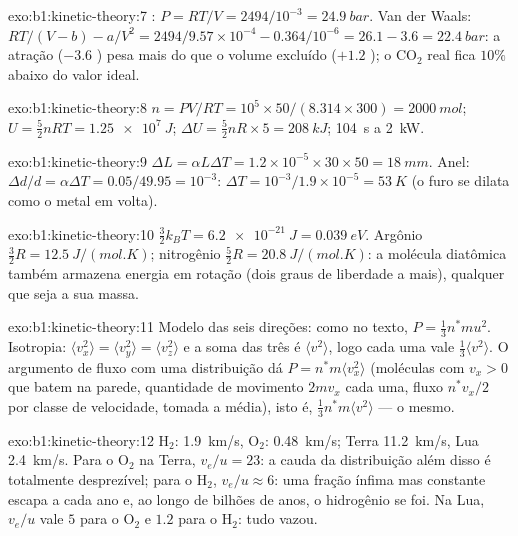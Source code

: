 \begin{solution}{exo:b1:kinetic-theory:7}
: $P = RT/V = 2494/10^{-3} = \qty{24.9}{bar}$. Van der Waals:
$RT/(V - b) - a/V^2 = 2494/9.57\times10^{-4} - 0.364/10^{-6} = 26.1 - 3.6 =
\qty{22.4}{bar}$: a atração ($-3.6$ ) pesa mais do que o volume
excluído ($+1.2$ ); o CO$_2$ real fica $10\%$ abaixo do valor ideal.
\end{solution}

\begin{solution}{exo:b1:kinetic-theory:8}
$n = PV/RT = 10^5 \times 50/(8.314 \times 300) = \qty{2000}{mol}$; $U = \tfrac52
nRT = \qty{1.25e7}{J}$; $\Delta U = \tfrac52 nR \times 5 = \qty{208}{kJ}$;
\qty{104}{s} a \qty{2}{kW}.
\end{solution}

\begin{solution}{exo:b1:kinetic-theory:9}
$\Delta L = \alpha L\Delta T = 1.2\times10^{-5} \times 30 \times 50 = \qty{18}{mm}$.
Anel: $\Delta d/d = \alpha\Delta T = 0.05/49.95 = 10^{-3}$: $\Delta T = 10^{-3}/
1.9\times10^{-5} = \qty{53}{K}$ (o furo se dilata como o metal em volta).
\end{solution}

\begin{solution}{exo:b1:kinetic-theory:10}
$\tfrac32 k_BT = \qty{6.2e-21}{J} = \qty{0.039}{eV}$. Argônio $\tfrac32 R =
\qty{12.5}{J/(mol.K)}$; nitrogênio $\tfrac52 R = \qty{20.8}{J/(mol.K)}$: a
molécula diatômica também armazena energia em rotação (dois graus de
liberdade a mais), qualquer que seja a sua massa.
\end{solution}

\begin{solution}{exo:b1:kinetic-theory:11}
Modelo das seis direções: como no texto, $P = \tfrac13 n^*mu^2$. Isotropia:
$\langle v_x^2\rangle = \langle v_y^2\rangle = \langle v_z^2\rangle$ e a soma
das três é $\langle v^2\rangle$, logo cada uma vale $\tfrac13\langle v^2\rangle$. O argumento
de fluxo com uma distribuição dá $P = n^*m\langle v_x^2\rangle$ (moléculas
com $v_x > 0$ que batem na parede, quantidade de movimento $2mv_x$ cada uma, fluxo $n^*v_x/2$ por
classe de velocidade, tomada a média), isto é, $\tfrac13 n^*m\langle v^2\rangle$ --- o mesmo.
\end{solution}

\begin{solution}{exo:b1:kinetic-theory:12}
H$_2$: \qty{1.9}{km/s}, O$_2$: \qty{0.48}{km/s}; Terra \qty{11.2}{km/s}, Lua
\qty{2.4}{km/s}. Para o O$_2$ na Terra, $v_e/u = 23$: a cauda da
distribuição além disso é totalmente desprezível; para o H$_2$, $v_e/u \approx 6$:
uma fração ínfima mas constante escapa a cada ano e, ao longo de bilhões de
anos, o hidrogênio se foi. Na Lua, $v_e/u$ vale $5$ para o O$_2$ e
$1.2$ para o H$_2$: tudo vazou.
\end{solution}

